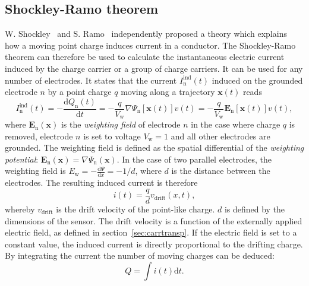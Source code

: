\subsection{Shockley-Ramo theorem}
W. Shockley~\cite{SHOCKLEY:00000} and S. Ramo~\cite{RAMO:00000} independently proposed a theory which explains how a moving point charge induces current in a conductor. The Shockley-Ramo theorem can therefore be used to calculate the instantaneous electric current induced by the charge carrier or a group of charge carriers. It can be used for any number of electrodes. It states that the current $I_\mathrm{n}^{\mathrm{ind}}(t)$ induced on the grounded electrode $n$ by a point charge $q$ moving along a trajectory $\textbf{x}(t)$ reads
\begin{equation}
\label{eq:ramo}
I_\mathrm{n}^{\mathrm{ind}}(t) = -\frac{\mathrm{d}Q_\mathrm{n}(t)}{\mathrm{d}t} =  -\frac{q}{V_\mathrm{w}}\nabla\Psi_\mathrm{n}[\textbf{x}(t)]v(t)  =  -\frac{q}{V_\mathrm{w}}\textbf{E}_\mathrm{n}[\textbf{x}(t)]v(t),
\end{equation}
where $\textbf{E}_\mathrm{n}(\textbf{x})$ is the \emph{weighting field} of electrode $n$ in the case where charge $q$ is removed, electrode $n$ is  set to voltage $V_\mathrm{w}=1$ and all other electrodes are grounded.  The weighting field is defined as the spatial differential of the \emph{weighting potential}: $\textbf{E}_\mathrm{n}(\textbf{x})=\nabla \Psi_\mathrm{n}(\textbf{x})$. In the case of two parallel electrodes, the weighting field is $E_\mathrm{w} = -\frac{\mathrm{d}\Psi}{\mathrm{d}x} = -1/d$, where $d$ is the distance between the electrodes. The resulting induced current is therefore
\begin{equation}
\label{eq:ramoparallel}
i(t) = \frac{q}{d}v_\mathrm{drift}(x,t),
\end{equation} 
whereby $v_{\mathrm{drift}}$ is the drift velocity of the point-like charge. $d$ is defined by the dimensions of the sensor. The drift velocity is a function of the externally applied electric field, as defined in section~\ref{sec:carrtransp}. If the electric field is set to a constant value, the induced current is directly proportional to the drifting charge. 
By integrating the current the number of moving charges can be deduced:
\begin{equation}
\label{eq:ramoparallel}
Q = \int i(t) \mathrm{d}t.
\end{equation} 




